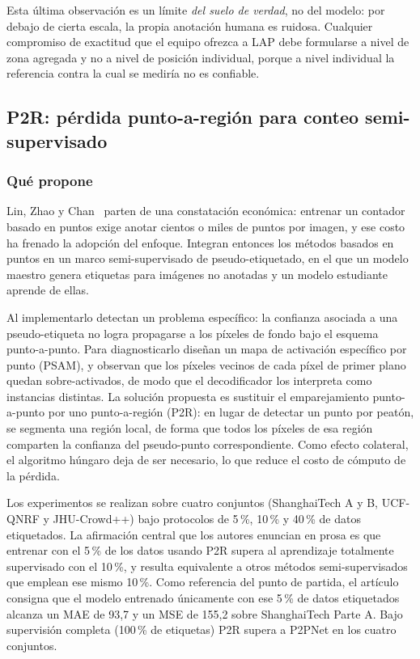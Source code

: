 Esta última observación es un límite \emph{del suelo de verdad}, no del
modelo: por debajo de cierta escala, la propia anotación humana es
ruidosa. Cualquier compromiso de exactitud que el equipo ofrezca a LAP
debe formularse a nivel de zona agregada y no a nivel de posición
individual, porque a nivel individual la referencia contra la cual se
mediría no es confiable.

\subsection{P2R: pérdida punto-a-región para conteo semi-supervisado}
\label{sec:ant-p2r}

\subsubsection*{Qué propone}

Lin, Zhao y Chan~\cite{Lin_2025_CVPR} parten de una constatación
económica: entrenar un contador basado en puntos exige anotar cientos o
miles de puntos por imagen, y ese costo ha frenado la adopción del
enfoque. Integran entonces los métodos basados en puntos en un marco
semi-supervisado de pseudo-etiquetado, en el que un modelo maestro genera
etiquetas para imágenes no anotadas y un modelo estudiante aprende de
ellas.

Al implementarlo detectan un problema específico: la confianza asociada a
una pseudo-etiqueta no logra propagarse a los píxeles de fondo bajo el
esquema punto-a-punto. Para diagnosticarlo diseñan un mapa de activación
específico por punto (PSAM), y observan que los píxeles vecinos de cada
píxel de primer plano quedan sobre-activados, de modo que el
decodificador los interpreta como instancias distintas. La solución
propuesta es sustituir el emparejamiento punto-a-punto por uno
punto-a-región (P2R): en lugar de detectar un punto por peatón, se
segmenta una región local, de forma que todos los píxeles de esa región
comparten la confianza del pseudo-punto correspondiente. Como efecto
colateral, el algoritmo húngaro deja de ser necesario, lo que reduce el
costo de cómputo de la pérdida.

Los experimentos se realizan sobre cuatro conjuntos (ShanghaiTech A y
B, UCF-QNRF y JHU-Crowd++) bajo protocolos de 5\,\%, 10\,\% y 40\,\%
de datos etiquetados. La afirmación central que los autores enuncian en
prosa es que entrenar con el 5\,\% de los datos usando P2R supera al
aprendizaje totalmente supervisado con el 10\,\%, y resulta equivalente a
otros métodos semi-supervisados que emplean ese mismo 10\,\%. Como
referencia del punto de partida, el artículo consigna que el modelo
entrenado únicamente con ese 5\,\% de datos etiquetados alcanza un MAE de
93,7 y un MSE de 155,2 sobre ShanghaiTech Parte A. Bajo supervisión
completa (100\,\% de etiquetas) P2R supera a P2PNet en los cuatro
conjuntos.

